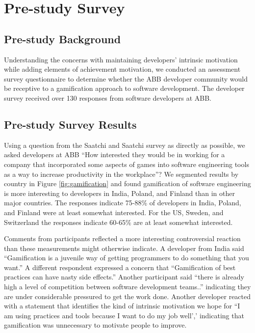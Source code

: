 \documentclass{sig-alternate}
\begin{document}
\section{Pre-study Survey}

\subsection{Pre-study Background}

Understanding the concerns with maintaining developers'  intrinsic motivation while adding elements of achievement motivation, we conducted an assessment survey questionnaire to determine whether the ABB developer community would be receptive to a gamification approach to software development.  The developer survey received over 130 responses from software developers at ABB.

\subsection{Pre-study Survey Results}

Using a question from the Saatchi and Saatchi survey \cite{wbsnipes:SaatchiGameification} as directly as possible, we asked developers at ABB ``How interested they would be in working for a company that incorporated some aspects of games into software engineering tools as a way to increase productivity in the workplace''?  We segmented results by country in Figure \ref{fig:gamification} and found gamification of software engineering is more interesting to developers in India, Poland, and Finland than in other major countries.  The responses indicate 75-88\% of developers in India, Poland, and Finland were at least somewhat interested.  For the US, Sweden, and Switzerland the responses indicate 60-65\% are at least somewhat interested.  

Comments from participants reflected a more interesting controversial reaction than these measurements might otherwise indicate.  A developer from India said ``Gamification is a juvenile way of getting programmers to do something that you want.''  A different respondent expressed a concern that ``Gamification of best practices can have nasty side effects.''  Another participant said ``there is already high a level of competition between software development teams..'' indicating they are under considerable pressured to get the work done.  Another developer reacted with a statement that identifies the kind of intrinsic motivation we hope for ``I am using practices and tools because I want to do my job well',' indicating that gamification was unnecessary to motivate people to improve.
\end{document}
